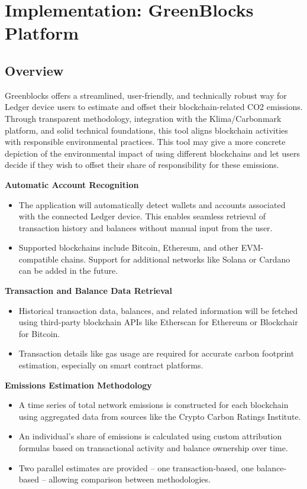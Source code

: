 \documentclass[11pt]{report}
\begin{document}
\section{Implementation: GreenBlocks Platform}
\subsection{Overview \label{se:implementation_overview}}

Greenblocks offers a streamlined, user-friendly, and technically robust way for Ledger device users to estimate and offset their blockchain-related CO2 emissions. Through transparent methodology, integration with the Klima/Carbonmark platform, and solid technical foundations, this tool aligns blockchain activities with responsible environmental practices. This tool may give a more concrete depiction of the environmental impact of using different blockchains and let users decide if they wish to offset their share of responsibility for these emissions.

\textbf{Automatic Account Recognition}

\begin{itemize}
    \item The application will automatically detect wallets and accounts associated with the connected Ledger device. This enables seamless retrieval of transaction history and balances without manual input from the user.
    \item Supported blockchains include Bitcoin, Ethereum, and other EVM-compatible chains. Support for additional networks like Solana or Cardano can be added in the future.
\end{itemize}

\textbf{Transaction and Balance Data Retrieval}

\begin{itemize}
    \item Historical transaction data, balances, and related information will be fetched using third-party blockchain APIs like Etherscan for Ethereum or Blockchair for Bitcoin.
    \item Transaction details like gas usage are required for accurate carbon footprint estimation, especially on smart contract platforms.
\end{itemize}

\textbf{Emissions Estimation Methodology}

\begin{itemize}
    \item A time series of total network emissions is constructed for each blockchain using aggregated data from sources like the Crypto Carbon Ratings Institute.
    \item An individual's share of emissions is calculated using custom attribution formulas based on transactional activity and balance ownership over time.
    \item Two parallel estimates are provided -- one transaction-based, one balance-based -- allowing comparison between methodologies.
\end{itemize}
\end{document}
